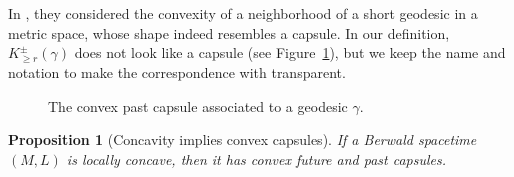 \documentclass[a4paper,11pt]{article}
\numberwithin{equation}{section}
\theoremstyle{definition}
\theoremstyle{plain}
\newtheorem{proposition}[definition]{Proposition}
\begin{document}
In \cite[Definition~3]{KK}, they considered the convexity of a neighborhood of a short geodesic in a metric space, whose shape indeed resembles a capsule.
In our definition, $K_{\ge r}^\pm (\gamma)$ does not look like a capsule (see Figure~\ref{fig: convex past capsule}), but we keep the name and notation to make the correspondence with \cite{KK} transparent. 

\begin{figure}
\begin{center}
\end{center}
\caption{The convex past capsule associated to a geodesic $\gamma$.}
\label{fig: convex past capsule}
\end{figure}

\begin{proposition}[Concavity implies convex capsules]
\label{pr:ccv-cap}
If a Berwald spacetime $(M,L)$ is locally concave, then it has convex future and past capsules.
\end{proposition}
\end{document}
